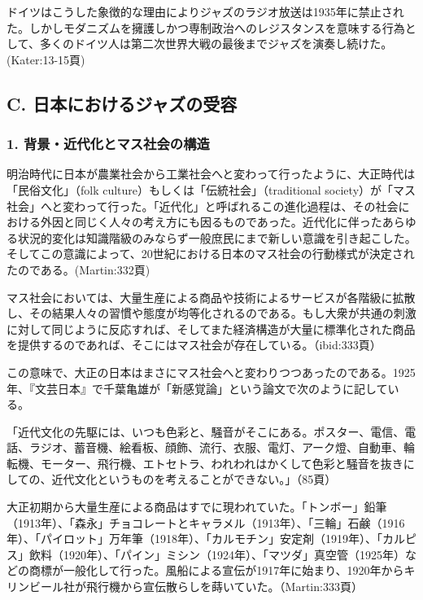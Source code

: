 ドイツはこうした象徴的な理由によりジャズのラジオ放送は1935年に禁止された。しかしモダニズムを擁護しかつ専制政治へのレジスタンスを意味する行為として、多くのドイツ人は第二次世界大戦の最後までジャズを演奏し続けた。(Kater:13-15頁)

\subsection{C. 日本におけるジャズの受容}

\subsubsection{1. 背景・近代化とマス社会の構造}

明治時代に日本が農業社会から工業社会へと変わって行ったように、大正時代は「民俗文化」（folk culture）もしくは「伝統社会」（traditional society）が「マス社会」へと変わって行った。「近代化」と呼ばれるこの進化過程は、その社会における外因と同じく人々の考え方にも因るものであった。近代化に伴ったあらゆる状況的変化は知識階級のみならず一般庶民にまで新しい意識を引き起こした。そしてこの意識によって、20世紀における日本のマス社会の行動様式が決定されたのである。(Martin:332頁)

マス社会においては、大量生産による商品や技術によるサービスが各階級に拡散し、その結果人々の習慣や態度が均等化されるのである。もし大衆が共通の刺激に対して同じように反応すれば、そしてまた経済構造が大量に標準化された商品を提供するのであれば、そこにはマス社会が存在している。（ibid:333頁）

この意味で、大正の日本はまさにマス社会へと変わりつつあったのである。1925年、『文芸日本』で千葉亀雄が「新感覚論」という論文で次のように記している。

\begin{gquote}
「近代文化の先駆には、いつも色彩と、騒音がそこにある。ポスター、電信、電話、ラジオ、蓄音機、絵看板、顔飾、流行、衣服、電灯、アーク燈、自動車、輪転機、モーター、飛行機、エトセトラ、われわれはかくして色彩と騒音を抜きにしての、近代文化というものを考えることができない。」（85頁）
\end{gquote}

大正初期から大量生産による商品はすでに現われていた。「トンボー」鉛筆（1913年）、「森永」チョコレートとキャラメル（1913年）、「三輪」石鹸（1916年）、「パイロット」万年筆（1918年）、「カルモチン」安定剤（1919年）、「カルピス」飲料（1920年）、「パイン」ミシン（1924年）、「マツダ」真空管（1925年）などの商標が一般化して行った。風船による宣伝が1917年に始まり、1920年からキリンビール社が飛行機から宣伝散らしを蒔いていた。（Martin:333頁）

